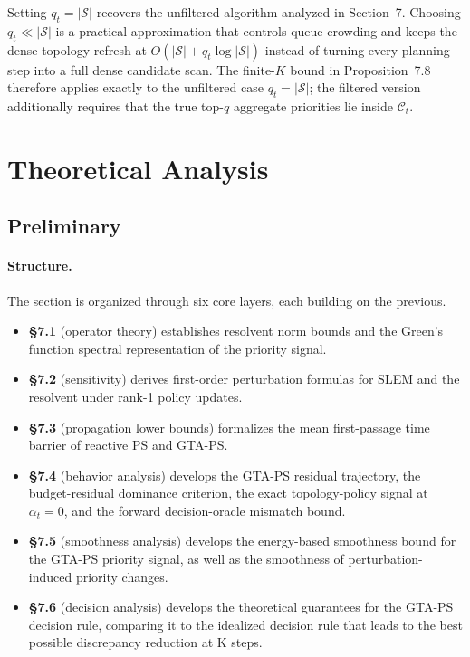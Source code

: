 \documentclass[10pt,a4paper]{article}
\begin{document}
Setting $q_t = |\mathcal{S}|$ recovers the unfiltered algorithm analyzed in Section~7. Choosing $q_t \ll |\mathcal{S}|$ is a practical approximation that controls queue crowding and keeps the dense topology refresh at $O(|\mathcal{S}| + q_t\log|\mathcal{S}|)$ instead of turning every planning step into a full dense candidate scan. The finite-$K$ bound in Proposition~7.8 therefore applies exactly to the unfiltered case $q_t=|\mathcal{S}|$; the filtered version additionally requires that the true top-$q$ aggregate priorities lie inside $\mathcal{C}_t$.




\section{Theoretical Analysis}

\subsection{Preliminary}

\paragraph{Structure.}
The section is organized through six core layers, each building on the previous.
\begin{itemize}
  \item \textbf{§7.1} (operator theory) establishes resolvent norm bounds and the Green's function spectral representation of the priority signal.
  \item \textbf{§7.2} (sensitivity) derives first-order perturbation formulas for SLEM and the resolvent under rank-1 policy updates.
  \item \textbf{§7.3} (propagation lower bounds) formalizes the mean first-passage time barrier of reactive PS and GTA-PS.
  \item \textbf{§7.4} (behavior analysis) develops the GTA-PS residual trajectory, the budget-residual dominance criterion, the exact topology-policy signal at $\alpha_t=0$, and the forward decision-oracle mismatch bound.
  \item \textbf{§7.5} (smoothness analysis) develops the energy-based smoothness bound for the GTA-PS priority signal, as well as the smoothness of perturbation-induced priority changes.
  \item \textbf{§7.6} (decision analysis) develops the theoretical guarantees for the GTA-PS decision rule, comparing it to the idealized decision rule that leads to the best possible discrepancy reduction at K steps.
\end{itemize}
\end{document}
